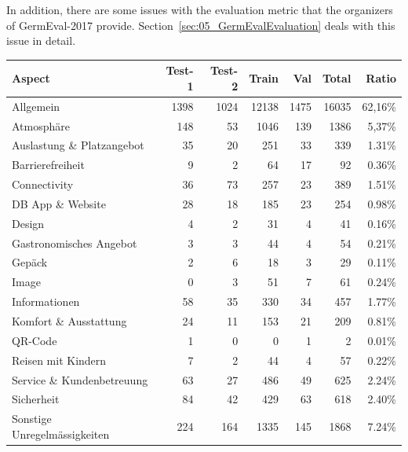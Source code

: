 In addition, there are some issues with the evaluation metric that the organizers of GermEval-2017 provide. Section~\ref{sec:05_GermEvalEvaluation} deals with this issue in detail.
\begin{table}
	\centering
	\begin{tabular}{lrrrrrr}
		\toprule
		Aspect                       & Test-1 & Test-2 & Train  & Val  & Total  & Ratio   \\ 
		\midrule
		Allgemein                    & 1398   & 1024   & 12138  & 1475 & 16035  & 62,16\% \\
		Atmosphäre                   & 148    & 53     & 1046   & 139  & 1386   & 5,37\%  \\
		Auslastung \& Platzangebot   & 35     & 20     & 251    & 33   & 339    & 1.31\%  \\
		Barrierefreiheit             & 9      & 2      & 64     & 17   & 92     & 0.36\%  \\
		Connectivity                 & 36     & 73     & 257    & 23   & 389    & 1.51\%  \\
		DB App \& Website            & 28     & 18     & 185    & 23   & 254    & 0.98\%  \\
		Design                       & 4      & 2      & 31     & 4    & 41     & 0.16\%  \\
		Gastronomisches Angebot      & 3      & 3      & 44     & 4    & 54     & 0.21\%  \\
		Gepäck                       & 2      & 6      & 18     & 3    & 29     & 0.11\%  \\
		Image                        & 0      & 3      & 51     & 7    & 61     & 0.24\%  \\
		Informationen                & 58     & 35     & 330    & 34   & 457    & 1.77\%  \\
		Komfort \& Ausstattung       & 24     & 11     & 153    & 21   & 209    & 0.81\%  \\
		QR-Code                      & 1      & 0      & 0      & 1    & 2      & 0.01\%  \\
		Reisen mit Kindern           & 7      & 2      & 44     & 4    & 57     & 0.22\%  \\
		Service \& Kundenbetreuung   & 63     & 27     & 486    & 49   & 625    & 2.24\%  \\
		Sicherheit                   & 84     & 42     & 429    & 63   & 618    & 2.40\%  \\
		Sonstige Unregelmässigkeiten & 224    & 164    & 1335   & 145  & 1868   & 7.24\%  \\

\end{tabular}
\end{table}
